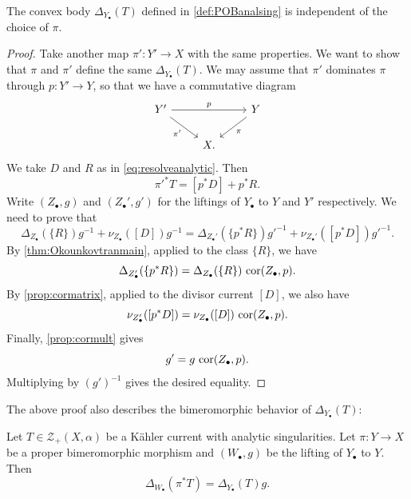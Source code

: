 \begin{lemma}\label{lma:Okounkov:L1426}
    The convex body $\Delta_{Y_{\bullet}}(T)$ defined in \cref{def:POBanalsing} is independent of the choice of $\pi$.
\end{lemma}
\begin{proof}
    Take another map $\pi'\colon Y'\rightarrow X$ with the same properties. We want to show that $\pi$ and $\pi'$ define the same $\Delta_{Y_{\bullet}}(T)$. We may assume that $\pi'$ dominates $\pi$ through $p\colon Y'\rightarrow Y$, so that we have a commutative diagram
    \[
    \begin{tikzcd}
Y' \arrow[rr, "p"] \arrow[rd, "\pi'"'] &   & Y \arrow[ld, "\pi"] \\
                                       & X. &
\end{tikzcd}
    \]
    We take $D$ and $R$ as in \eqref{eq:resolveanalytic}. Then
    \[
    \pi'^*T=[p^*D]+p^*R.
    \]
    Write $(Z_{\bullet},g)$ and $(Z_{\bullet}',g')$ for the liftings of $Y_{\bullet}$ to $Y$ and $Y'$ respectively.
    We need to prove that
    \[
    \Delta_{Z_{\bullet}}(\{R\})g^{-1}+\nu_{Z_{\bullet}}([D])g^{-1}=\Delta_{Z_{\bullet}'}(\{p^*R\})g'^{-1}+\nu_{Z_{\bullet}'}([p^*D])g'^{-1}.
    \]
    By \cref{thm:Okounkovtranmain}, applied to the class $\{R\}$, we have
    \[
        \Delta_{Z'_\bullet}(\{p^*R\})=\Delta_{Z_\bullet}(\{R\})\,\operatorname{cor}(Z_\bullet,p).
    \]
    By \cref{prop:cormatrix}, applied to the divisor current $[D]$, we also have
    \[
        \nu_{Z'_\bullet}([p^*D])=\nu_{Z_\bullet}([D])\,\operatorname{cor}(Z_\bullet,p).
    \]
    Finally, \cref{prop:cormult} gives
    \[
        g'=g\,\operatorname{cor}(Z_\bullet,p).
    \]
    Multiplying by $(g')^{-1}$ gives the desired equality.
\end{proof}

The above proof also describes the bimeromorphic behavior of $\Delta_{Y_{\bullet}}(T)$:
\begin{lemma}\label{lma:liftOkounana}
Let $T\in \mathcal{Z}_{+}(X,\alpha)$ be a Kähler current with analytic singularities.
    Let $\pi\colon Y\rightarrow X$ be a proper bimeromorphic morphism and $(W_{\bullet},g)$ be the lifting of $Y_{\bullet}$ to $Y$. Then
    \[
    \Delta_{W_{\bullet}}(\pi^*T)=\Delta_{Y_{\bullet}}(T)g.
    \]
\end{lemma}

